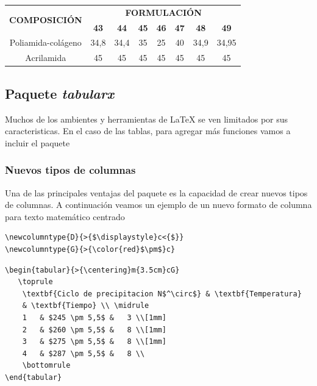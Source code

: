 \documentclass[a4,10pt]{aleph-notas}
\begin{document}
\begin{center}
 \begin{tabular}{cccccccc}
  \toprule
  \multirow{2}{*}{\textbf{COMPOSICIÓN}} & \multicolumn{7}{c}{\textbf{FORMULACIÓN}}\\ 
  \cmidrule{2-8}
    & \textbf{43} & \textbf{44} & \textbf{45} & \textbf{46} & \textbf{47} & \textbf{48} & \textbf{49}\\ \midrule
  Poliamida-colágeno    & 34,8  & 34,4 &	35  & 25  &	40  & 34,9  & 34,95\\[1mm] 
  Acrilamida           & 45	   & 45	  & 45	& 45  & 45	& 45	& 45   \\[1mm] \bottomrule
 \end{tabular}
\end{center}

\subsection{Paquete \emph{tabularx}}

Muchos de los ambientes y herramientas de \LaTeX{} se ven limitados por sus caracteristicas. En el caso de las tablas, para agregar más funciones vamos a incluir el paquete \verb@tabularx@

\subsubsection{Nuevos tipos de columnas}

Una de las principales ventajas del paquete \verb@tabularx@ es la capacidad de crear nuevos tipos de columnas. A continuación veamos un ejemplo de un nuevo formato de columna para texto matemático centrado

\begin{lstlisting}[frame=single]
\newcolumntype{D}{>{$\displaystyle}c<{$}}
\newcolumntype{G}{>{\color{red}$\pm$}c}
\end{lstlisting}

\begin{lstlisting}[frame=single]
\begin{tabular}{>{\centering}m{3.5cm}cG}
   \toprule
    \textbf{Ciclo de precipitacion N$^\circ$} &	\textbf{Temperatura} 
    & \textbf{Tiempo} \\ \midrule
    1   & $245 \pm 5,5$ &	3 \\[1mm]
    2	& $260 \pm 5,5$ &	8 \\[1mm]
    3	& $275 \pm 5,5$ &	8 \\[1mm]
    4	& $287 \pm 5,5$ &	8 \\
    \bottomrule
\end{tabular}
\end{lstlisting}
\end{document}
